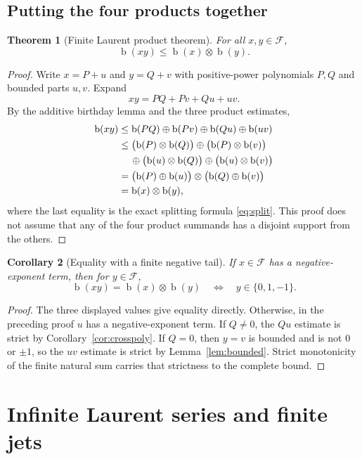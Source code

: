 \documentclass[11pt,letterpaper]{article}
\numberwithin{equation}{section}
\newtheorem{theorem}{Theorem}[section]
\newtheorem{corollary}[theorem]{Corollary}
\theoremstyle{definition}
\theoremstyle{remark}
\newcommand{\Fin}{\mathcal{F}}
\newcommand{\bd}{\operatorname{b}}
\newcommand{\ns}{\mathbin{\oplus}}
\newcommand{\np}{\mathbin{\otimes}}
\begin{document}
\subsection{Putting the four products together}
\begin{theorem}[Finite Laurent product theorem]\label{thm:finiteproduct}
For all $x,y\in\Fin$,
\[
 \bd(xy)\leq\bd(x)\np\bd(y).
\]
\end{theorem}
\begin{proof}
Write $x=P+u$ and $y=Q+v$ with positive-power polynomials $P,Q$ and bounded
parts $u,v$. Expand
\[
 xy=PQ+Pv+Qu+uv.
\]
By the additive birthday lemma and the three product estimates,
\begin{align*}
 \bd(xy)
 &\leq\bd(PQ)\ns\bd(Pv)\ns\bd(Qu)\ns\bd(uv)\\
 &\leq\bigl(\bd(P)\np\bd(Q)\bigr)
     \ns\bigl(\bd(P)\np\bd(v)\bigr)\\
 &\hspace{1.2em}\ns\bigl(\bd(u)\np\bd(Q)\bigr)
     \ns\bigl(\bd(u)\np\bd(v)\bigr)\\
 &=\bigl(\bd(P)\ns\bd(u)\bigr)
     \np\bigl(\bd(Q)\ns\bd(v)\bigr)\\
 &=\bd(x)\np\bd(y),
\end{align*}
where the last equality is the exact splitting formula
\eqref{eq:split}. This proof does not assume that any of the four product
summands has a disjoint support from the others.
\end{proof}

\begin{corollary}[Equality with a finite negative tail]\label{cor:strict}
If $x\in\Fin$ has a negative-exponent term, then for $y\in\Fin$,
\[
 \bd(xy)=\bd(x)\np\bd(y)
 \quad\Longleftrightarrow\quad y\in\{0,1,-1\}.
\]
\end{corollary}
\begin{proof}
The three displayed values give equality directly. Otherwise, in the preceding
proof $u$ has a negative-exponent term. If $Q\neq0$, the $Qu$ estimate is
strict by Corollary~\ref{cor:crosspoly}. If $Q=0$, then $y=v$ is bounded and
is not $0$ or $\pm1$, so the $uv$ estimate is strict by
Lemma~\ref{lem:bounded}. Strict monotonicity of the finite natural sum carries
that strictness to the complete bound.
\end{proof}

\section{Infinite Laurent series and finite jets}
\label{sec:infinite}
\end{document}
